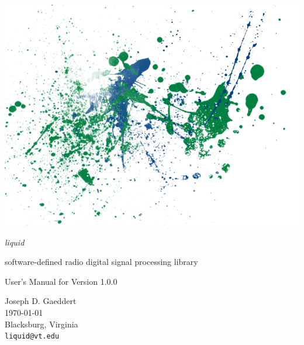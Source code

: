 \documentclass[11pt,twoside]{article}
\begin{document}



%
%
\thispagestyle{empty}
\begin{center}
\includegraphics[width=\textwidth]{graphics/liquid_splatter_00.png}
\end{center}

\vfill

\noindent
{\huge\it liquid}

\noindent
software-defined radio digital signal processing library

\vfill

\noindent
User's Manual for Version 1.0.0

\vfill

\noindent
Joseph D. Gaeddert \\
\today \\
Blacksburg, Virginia \\
{\tt liquid@vt.edu}


\pagebreak
%
%
\tableofcontents
\pagebreak

\end{document}
